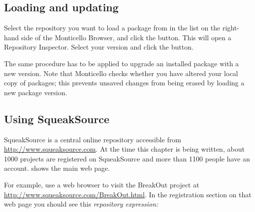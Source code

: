\documentclass[a4paper,10pt,twoside]{book}
\begin{document}
\subsection{Loading and updating}

Select the repository you want to load a package from in the list on the right-hand side of the Monticello Browser, and click the  button. This will open a Repository Inspector. Select your version and click the  button.


The same procedure has to be applied to upgrade an installed package with a new version. Note that Monticello checks whether you have altered your local copy of packages; this prevents unsaved changes from being erased by loading a new package version.


\subsection{Using SqueakSource}

SqueakSource is a central online repository accessible from \url{http://www.squeaksource.com}. At the time this chapter is being written, about 1000 projects are registered on SqueakSource and more than 1100 people have an account.  shows the main web page.  

For example, use a web browser to visit the BreakOut project at \url{http://www.squeaksource.com/BreakOut.html}. In the registration section on that web page you should see this \emph{repository expression:}
\end{document}
